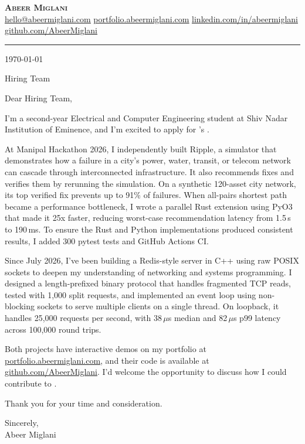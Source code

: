\documentclass[letterpaper,11pt]{article}
\newcommand{\ulink}[2]{\href{#1}{\underline{#2\vphantom{/}}}}
\begin{document}
\begin{center}
    \textbf{\Huge \scshape Abeer Miglani} \\ \vspace{3pt}
    \small \ulink{mailto:hello@abeermiglani.com}{hello@abeermiglani.com} \quad
    \ulink{https://portfolio.abeermiglani.com}{portfolio.abeermiglani.com} \quad
    \ulink{https://linkedin.com/in/abeermiglani}{linkedin.com/in/abeermiglani} \quad
    \ulink{https://github.com/AbeerMiglani}{github.com/AbeerMiglani}
\end{center}
\vspace{-6pt}
\rule{\textwidth}{0.4pt}

\today

Hiring Team \\
\Company

Dear Hiring Team,

I'm a second-year Electrical and Computer Engineering student at Shiv Nadar Institution of Eminence, and I'm excited to apply for \Company's \Role. \WhyCompany

At Manipal Hackathon 2026, I independently built Ripple, a simulator that demonstrates how a failure in a city's power, water, transit, or telecom network can cascade through interconnected infrastructure. It also recommends fixes and verifies them by rerunning the simulation. On a synthetic 120-asset city network, its top verified fix prevents up to 91\% of failures. When all-pairs shortest path became a performance bottleneck, I wrote a parallel Rust extension using PyO3 that made it 25x faster, reducing worst-case recommendation latency from 1.5\,s to 190\,ms. To ensure the Rust and Python implementations produced consistent results, I added 300 pytest tests and GitHub Actions CI.

Since July 2026, I've been building a Redis-style server in C++ using raw POSIX sockets to deepen my understanding of networking and systems programming. I designed a length-prefixed binary protocol that handles fragmented TCP reads, tested with 1,000 split requests, and implemented an event loop using non-blocking sockets to serve multiple clients on a single thread. On loopback, it handles 25,000 requests per second, with 38\,$\mu$s median and 82\,$\mu$s p99 latency across 100,000 round trips.

\Fit

Both projects have interactive demos on my portfolio at \ulink{https://portfolio.abeermiglani.com}{portfolio.abeermiglani.com}, and their code is available at \ulink{https://github.com/AbeerMiglani}{github.com/AbeerMiglani}. I'd welcome the opportunity to discuss how I could contribute to \Company.

Thank you for your time and consideration.

Sincerely, \\[0.4em]
Abeer Miglani
\end{document}
